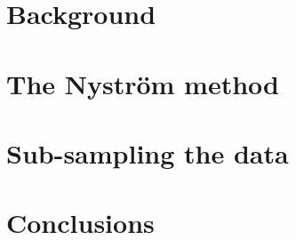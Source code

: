 \section{Background}
\label{sec:ch05_background}

\section{The Nystr\"om method}
\label{sec:the_nystrom_method}

\section{Sub-sampling the data}
\label{sec:sub_sampling_the_data}


\section{Conclusions}
\label{Conslusions}

\chapterend